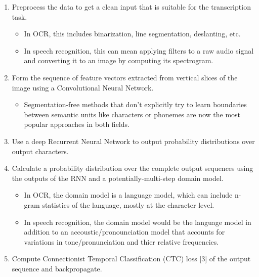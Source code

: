 \documentclass{article}
\begin{document}
\begin{enumerate}
\item Preprocess the data to get a clean input that is suitable for the
  transcription task.
  \begin{itemize}
  \item In OCR, this includes binarization, line segmentation, deslanting, etc.
  \item In speech recognition, this can mean applying filters to a raw audio
    signal and converting it to an image by computing its spectrogram.
  \end{itemize}
\item Form the sequence of feature vectors extracted from vertical slices of the
  image using a Convolutional Neural Network.
  \begin{itemize}
  \item Segmentation-free methods that don't explicitly try to learn boundaries
    between semantic units like characters or phonemes are now the most popular
    approaches in both fields.
  \end{itemize}
\item Use a deep Recurrent Neural Network to output probability distributions
  over output characters.
\item Calculate a probability distribution over the complete output sequences
  using the outputs of the RNN and a potentially-multi-step domain model.
  \begin{itemize}
  \item In OCR, the domain model is a language model, which can include n-gram
    statistics of the language, mostly at the character level.
  \item In speech recognition, the domain model would be the language model in
    addition to an accoustic/pronounciation model that accounts for variations
    in tone/pronunciation and thier relative frequencies.
  \end{itemize}
\item Compute Connectionist Temporal Classification (CTC) loss [3] of the output
  sequence and backpropagate.
\end{enumerate}
\end{document}
